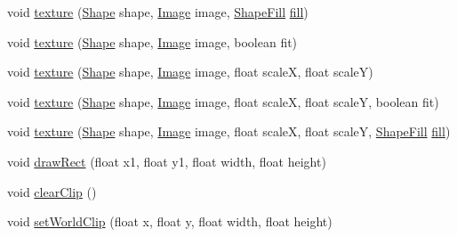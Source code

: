 \begin{DoxyCompactItemize}
\item 
void \mbox{\hyperlink{classorg_1_1newdawn_1_1slick_1_1_graphics_aacd46e4c18d1aedcf0e15a70ec4e0757}{texture}} (\mbox{\hyperlink{classorg_1_1newdawn_1_1slick_1_1geom_1_1_shape}{Shape}} shape, \mbox{\hyperlink{classorg_1_1newdawn_1_1slick_1_1_image}{Image}} image, \mbox{\hyperlink{interfaceorg_1_1newdawn_1_1slick_1_1_shape_fill}{Shape\+Fill}} \mbox{\hyperlink{classorg_1_1newdawn_1_1slick_1_1_graphics_a7c694d58339cd5e41270cb46aa52929c}{fill}})
\item 
void \mbox{\hyperlink{classorg_1_1newdawn_1_1slick_1_1_graphics_aa10510cdb86ee77083d4604844a62408}{texture}} (\mbox{\hyperlink{classorg_1_1newdawn_1_1slick_1_1geom_1_1_shape}{Shape}} shape, \mbox{\hyperlink{classorg_1_1newdawn_1_1slick_1_1_image}{Image}} image, boolean fit)
\item 
void \mbox{\hyperlink{classorg_1_1newdawn_1_1slick_1_1_graphics_a787c1040d15f2fe37b4594dacf9e4b4a}{texture}} (\mbox{\hyperlink{classorg_1_1newdawn_1_1slick_1_1geom_1_1_shape}{Shape}} shape, \mbox{\hyperlink{classorg_1_1newdawn_1_1slick_1_1_image}{Image}} image, float scaleX, float scaleY)
\item 
void \mbox{\hyperlink{classorg_1_1newdawn_1_1slick_1_1_graphics_aa8c82b28963ffc78ff16c374f92731b7}{texture}} (\mbox{\hyperlink{classorg_1_1newdawn_1_1slick_1_1geom_1_1_shape}{Shape}} shape, \mbox{\hyperlink{classorg_1_1newdawn_1_1slick_1_1_image}{Image}} image, float scaleX, float scaleY, boolean fit)
\item 
void \mbox{\hyperlink{classorg_1_1newdawn_1_1slick_1_1_graphics_aae178cb272144bb863741ca475f7f14d}{texture}} (\mbox{\hyperlink{classorg_1_1newdawn_1_1slick_1_1geom_1_1_shape}{Shape}} shape, \mbox{\hyperlink{classorg_1_1newdawn_1_1slick_1_1_image}{Image}} image, float scaleX, float scaleY, \mbox{\hyperlink{interfaceorg_1_1newdawn_1_1slick_1_1_shape_fill}{Shape\+Fill}} \mbox{\hyperlink{classorg_1_1newdawn_1_1slick_1_1_graphics_a7c694d58339cd5e41270cb46aa52929c}{fill}})
\item 
void \mbox{\hyperlink{classorg_1_1newdawn_1_1slick_1_1_graphics_a8ee4ef6a2e90cdd55f376429b7753d52}{draw\+Rect}} (float x1, float y1, float width, float height)
\item 
void \mbox{\hyperlink{classorg_1_1newdawn_1_1slick_1_1_graphics_a9e08c31449d2021836928b18daee5083}{clear\+Clip}} ()
\item 
void \mbox{\hyperlink{classorg_1_1newdawn_1_1slick_1_1_graphics_a9239d1442a3ccdda9880e0a798c6494a}{set\+World\+Clip}} (float x, float y, float width, float height)

\end{DoxyCompactItemize}

